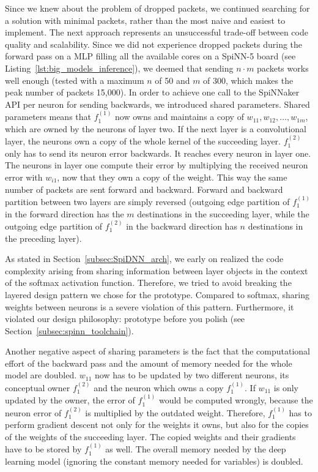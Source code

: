 \documentclass[]{article}
\begin{document}
Since we knew about the problem of dropped packets, we continued
searching for a solution with minimal packets, rather than the most
naive and easiest to implement.
The next approach represents an unsuccessful trade-off between code
quality and scalability.
Since we did not experience dropped packets during the forward pass on
a MLP filling all the available cores on a SpiNN-5 board (see
Listing~\ref{lst:big_models_inference}), we deemed that sending
$n \cdot m$ packets works well enough (tested with a maximum $n$ of 50
and $m$ of 300, which makes the peak number of packets 15,000).
In order to achieve one call to the SpiNNaker API per neuron for
sending backwards, we introduced shared parameters.
Shared parameters means that $f^{(1)}_1$ now owns and maintains a copy
of $w_{11}, w_{12}, \dots, w_{1m}$, which are owned by the neurons of
layer two.
If the next layer is a convolutional layer, the neurons own a copy of
the whole kernel of the succeeding layer.
$f^{(2)}_1$ only has to send its neuron error backwards.
It reaches every neuron in layer one.
The neurons in layer one compute their error by multiplying the
received neuron error with $w_{i1}$, now that they own a copy of the
weight.
This way the same number of packets are sent forward and backward.
Forward and backward partition between two layers are simply reversed
(outgoing edge partition of $f^{(1)}_1$ in the forward direction has
the $m$ destinations in the succeeding layer, while the outgoing
edge partition of $f^{(2)}_1$ in the backward direction has $n$
destinations in the preceding layer).

As stated in Section~\ref{subsec:SpiDNN_arch}, we early on realized
the code complexity arising from sharing information between layer
objects in the context of the softmax activation function.
Therefore, we tried to avoid breaking the layered design pattern
we chose for the prototype.
Compared to softmax, sharing weights between neurons is a severe
violation of this pattern.
Furthermore, it violated our design philosophy: prototype before you
polish (see Section~\ref{subsec:spinn_toolchain}).

Another negative aspect of sharing parameters is the fact that the
computational effort of the backward pass and the amount of memory
needed for the whole model are doubled.
$w_{11}$ now has to be updated by two different neurons, its
conceptual owner $f^{(2)}_1$ and the neuron which owns a copy
$f^{(1)}_1$.
If $w_{11}$ is only updated by the owner, the error of $f^{(1)}_1$
would be computed wrongly, because the neuron error of $f^{(2)}_1$ is
multiplied by the outdated weight.
Therefore, $f^{(1)}_1$ has to perform gradient descent not only for
the weights it owns, but also for the copies of the weights of the
succeeding layer.
The copied weights and their gradients have to be stored by
$f^{(1)}_1$ as well.
The overall memory needed by the deep learning model (ignoring the
constant memory needed for variables) is doubled.
\end{document}
